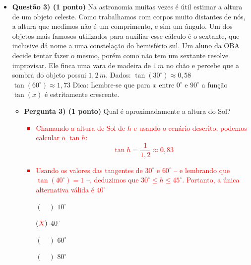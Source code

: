 \documentclass[a4paper, 12pt]{article}
\newcommand{\red}[1]{\textcolor{red}{#1}}
\begin{document}
\begin{flushleft}
\begin{itemize}
            \item \textbf{Questão 3) (1 ponto)} Na astronomia muitas vezes é útil estimar a altura de um objeto celeste. Como trabalhamos com corpos muito distantes de nós, a altura que medimos não é um comprimento, e sim um ângulo. Um dos objetos mais famosos utilizados para auxiliar esse cálculo é o sextante, que inclusive dá nome a uma constelação do hemisfério sul. Um aluno da OBA decide tentar fazer o mesmo, porém como não tem um sextante resolve improvisar. Ele finca uma vara de madeira de $1 \, m$ no chão e percebe que a sombra do objeto possui $1,2 \, m$. \linebreak \linebreak Dados: \linebreak $\tan(30^{\circ}) \approx 0,58$ \linebreak $\tan(60^{\circ}) \approx 1,73$ \linebreak \linebreak Dica: \linebreak Lembre-se que para $x$ entre $0^{\circ}$ e $90^{\circ}$ a função $\tan(x)$ é estritamente crescente.
                \begin{itemize}
                    \item \textbf{Pergunta 3) (1 ponto)} Qual é aproximadamente a altura do Sol?
                        \red{\begin{itemize}
                            \item Chamando a altura de Sol de $h$ e usando o cenário descrito, podemos calcular o $\tan h$:
                                \begin{equation*}
                                    \tan h = \frac{1}{1,2} \approx 0,83
                                \end{equation*}
                            \item Usando os valores das tangentes de $30^{\circ}$ e $60^{\circ}$ -- e lembrando que $\tan (40^{\circ}) = 1$ --, deduzimos que $30^{\circ} \leq h \leq 45^{\circ}$. Portanto, a única alternativa válida é $40^{\circ}$
                        \end{itemize}}
                        \begin{itemize}
                            \item[$(\quad)$] $10^{\circ}$
                            \item[$(\red{X})$] $40^{\circ}$
                            \item[$(\quad)$] $60^{\circ}$
                            \item[$(\quad)$] $80^{\circ}$
                        \end{itemize}
                \end{itemize}


\end{itemize}
\end{flushleft}
\end{document}
